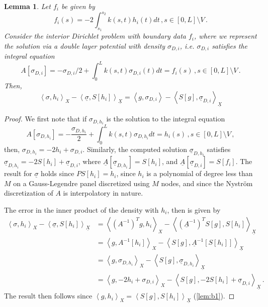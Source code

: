 \documentclass[12pt,times]{elsarticle}
\newcommand{\usigma}{\underline{\sigma}}
\newcommand{\uX}{\underline{X}}
\newtheorem{lem}{Lemma}
\begin{document}
{\begin{lem}
\label{lem:b2}
Let $f_{i}$ be given by
\begin{equation}
f_{i}(s) = -2 \int_{s_{1}}^{s_{2}} k(s,t) h_{i}(t) dt \, , s\in [0,L] \setminus V \, . \label{eq:deff}
\end{equation}
Consider the interior Dirichlet problem with boundary data $f_{i}$, where we represent the solution via a double layer potential with density $\sigma_{D,i}$, i.e. $\sigma_{D,i}$ satisfies the integral equation
\begin{equation}
A[\sigma_{D,i}] = -\sigma_{D,i}/2 + \int_{0}^{L} k(s,t) \sigma_{D,i}(t) dt  = f_{i}(s) \, , s\in [0,L] \setminus V \, . 
\end{equation}
Then,
\begin{equation}
\left< \sigma, h_{i} \right>_{X} -  \left< \usigma, S[h_{i}] \right>_{\uX} = 
\left< g, \sigma_{D,i} \right> - \left< S[g], \usigma_{D,i} \right>_{\uX}
\end{equation}
\end{lem}

\begin{proof}
We first note that if $\sigma_{D,h_{i}}$ is the solution to the integral equation
\begin{equation}
A[\sigma_{D,h_{i}}] = -\frac{\sigma_{D,h_{i}}}{2} + \int_{0}^{L} k(s,t) \sigma_{D,h_{i}} dt = h_{i}(s) \, , s \in [0,L] \setminus V \, ,
\end{equation}
then, $\sigma_{D,h_{i}} = -2h_{i} + \sigma_{D,i}$. 
Similarly, the computed solution $\usigma_{D,h_{i}}$ satisfies $\usigma_{D,h_{i}} = -2S[h_{i}] + \usigma_{D,i}$, where
$\underline{A} [\usigma_{D,h_{i}}] = S[h_{i}]$, and $\underline{A}[\usigma_{D,i}] = S[f_{i}]$. The result for $\usigma$ holds since $PS[h_{i}] = h_{i}$, since $h_{i}$ is a polynomial of degree less than $M$ on a Gauss-Legendre panel discretized using $M$ nodes, and since the Nystr\"{o}m discretization of $A$ is interpolatory in nature.

The error in the inner product of the density with $h_{i}$, then is given by
\begin{equation}
\begin{aligned}
\left< \sigma, h_{i} \right>_{X} -  \left< \usigma, S[h_{i}] \right>_{\uX} &=
\left< (A^{-1})^{T}g, h_{i} \right>_{X} -  \left< (\underline{A}^{-1})^{T}S[g], S[h_{i}] \right>_{\uX}   \\
&=\left< g, A^{-1}[h_{i}] \right>_{X} -  \left< S[g], \underline{A}^{-1}[S[h_{i}]] \right>_{\uX}   \\
&=\left< g, \sigma_{D,h_{i}} \right>_{X} -  \left< S[g], \usigma_{D,h_{i}} \right>_{\uX}   \\
&=\left< g, -2h_{i} + \sigma_{D,i} \right>_{X} -  \left< S[g], -2S[h_{i}] + \usigma_{D,i} \right>_{\uX}   \, .
\end{aligned}
\end{equation}
The result then follows since $\left<g,h_{i} \right>_{X} = \left<S[g],S[h_{i}] \right>_{\uX}$ (\cref{lem:b1}).
\end{proof}

}
\end{document}

